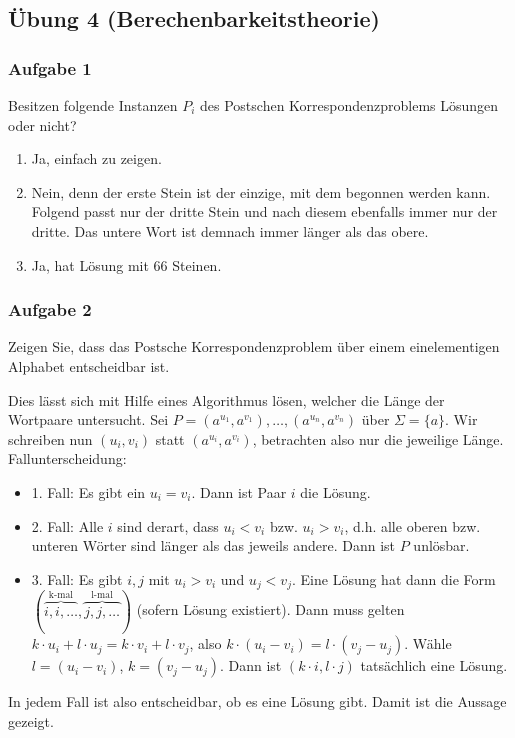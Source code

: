 \newpage

\subsection*{Übung 4 (Berechenbarkeitstheorie)}
\subsubsection*{Aufgabe 1}
    Besitzen folgende Instanzen $P_{i}$ des Postschen Korrespondenzproblems Lösungen oder nicht?
    \begin{enumerate}
        \item Ja, einfach zu zeigen.
        \item Nein, denn der erste Stein ist der einzige, mit dem begonnen werden kann. Folgend passt nur der dritte Stein und nach diesem ebenfalls immer nur der dritte. Das untere Wort ist demnach immer länger als das obere.
        \item Ja, hat Lösung mit 66 Steinen.
    \end{enumerate}


\subsubsection*{Aufgabe 2}
    Zeigen Sie, dass das Postsche Korrespondenzproblem über einem einelementigen Alphabet entscheidbar ist.

    \LOES Dies lässt sich mit Hilfe eines Algorithmus lösen, welcher die Länge der Wortpaare untersucht.
    Sei $P = (a^{u_{1}}, a^{v_{1}}), \dots, (a^{u_{n}}, a^{v_{n}})$ über $\Sigma = \{ a \}$. Wir schreiben nun $(u_{i}, v_{i})$ statt $(a^{u_{i}}, a^{v_{i}})$, betrachten also nur die jeweilige Länge. Fallunterscheidung:
    \begin{itemize}
        \item 1. Fall: Es gibt ein $u_{i} = v_{i}$. Dann ist Paar $i$ die Lösung.
        \item 2. Fall: Alle $i$ sind derart, dass $u_{i} < v_{i}$ bzw. $u_{i} > v_{i}$, d.h. alle oberen bzw. unteren Wörter sind länger als das jeweils andere. Dann ist $P$ unlösbar.
        \item 3. Fall: Es gibt $i, j$ mit $u_{i} > v_{i}$ und $u_{j} < v_{j}$. Eine Lösung hat dann die Form $(\overbrace{i,i,\dots}^\text{k-mal},\overbrace{j,j,\dots}^\text{l-mal})$ (sofern Lösung existiert). Dann muss gelten $k \cdot u_{i} + l \cdot u_{j} = k \cdot v_{i} + l \cdot v_{j}$, also $k \cdot (u_{i} - v_{i}) = l \cdot (v_{j} - u_{j})$. Wähle $l = (u_{i} - v_{i})$, $k = (v_{j} - u_{j})$. Dann ist $(k \cdot i, l \cdot j)$ tatsächlich eine Lösung.
    \end{itemize}
    In jedem Fall ist also entscheidbar, ob es eine Lösung gibt. Damit ist die Aussage gezeigt.


